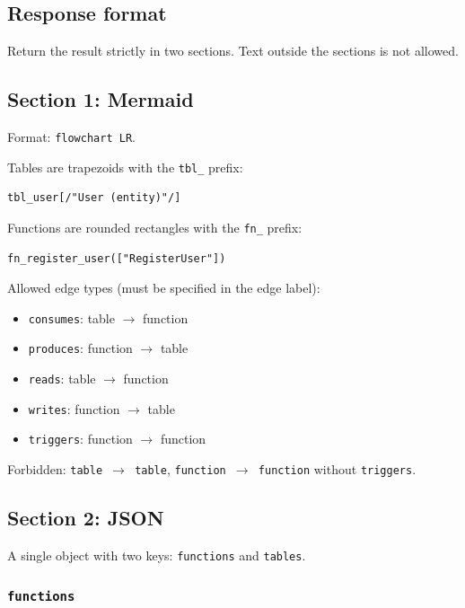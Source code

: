 \subsection{Response format}

Return the result strictly in two sections. Text outside the sections is not allowed.

\subsection{Section 1: Mermaid}

Format: \texttt{flowchart LR}.

Tables are trapezoids with the \texttt{tbl\_} prefix:

\begin{verbatim}
tbl_user[/"User (entity)"/]
\end{verbatim}

Functions are rounded rectangles with the \texttt{fn\_} prefix:

\begin{verbatim}
fn_register_user(["RegisterUser"])
\end{verbatim}

Allowed edge types (must be specified in the edge label):

\begin{itemize}
\item \texttt{consumes}: table $\to$ function
\item \texttt{produces}: function $\to$ table
\item \texttt{reads}: table $\to$ function
\item \texttt{writes}: function $\to$ table
\item \texttt{triggers}: function $\to$ function
\end{itemize}

Forbidden: \texttt{table $\to$ table}, \texttt{function $\to$ function} without \texttt{triggers}.

\subsection{Section 2: JSON}

A single object with two keys: \texttt{functions} and \texttt{tables}.

\subsubsection{\texttt{functions}}

